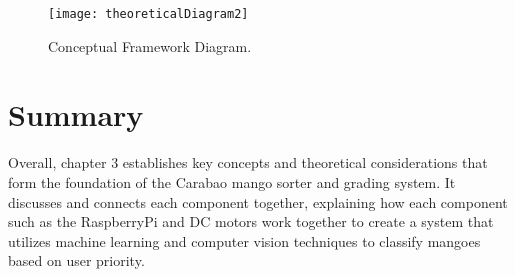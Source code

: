 \begin{figure}[!htbp]
	\centering
	\texttt{[image: theoreticalDiagram2]}
	\caption{Conceptual Framework Diagram.}
	\label{fig:theoreticalDiagram2}
\end{figure}


\section{Summary}

Overall, chapter 3 establishes key concepts and theoretical considerations that form the foundation of the Carabao mango sorter and grading system. It discusses and connects each component together, explaining how each component such as the RaspberryPi and DC motors work together to create a system that utilizes machine learning and computer vision techniques to classify mangoes based on user priority.